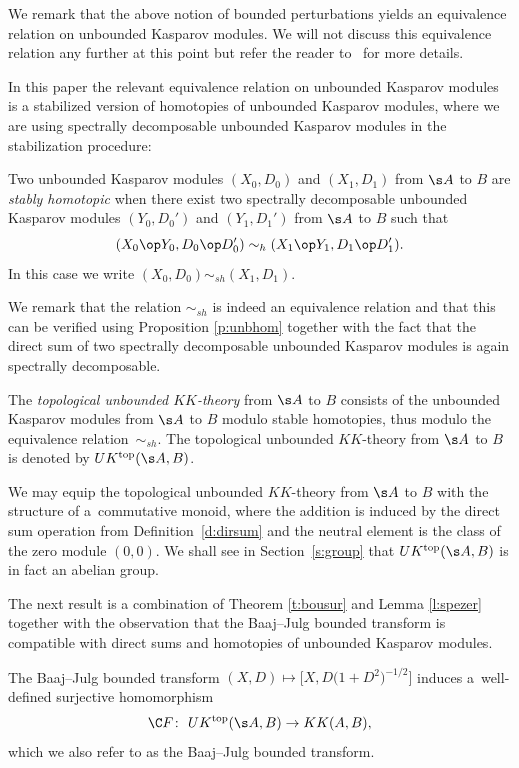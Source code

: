 We remark that the above notion of bounded perturbations yields an equivalence relation on unbounded Kasparov modules. We will not discuss this equivalence relation any further at this point but refer the reader to~\cite{Kaa:MEU} for more details.

In this paper the relevant equivalence relation on unbounded Kasparov modules is a stabilized version of homotopies of unbounded Kasparov modules, where we are using spectrally decomposable unbounded Kasparov modules in the stabilization procedure:

\begin{dfn}
Two unbounded Kasparov modules $(X_0,D_0)$ and $(X_1,D_1)$ from $\s A$ to $B$ are \emph{stably homotopic} when there exist two spectrally decomposable unbounded Kasparov modules $(Y_0,D_0')$ and $(Y_1,D_1')$ from $\s A$ to $B$ such that
\[
(X_0 \op Y_0,D_0 \op D_0') \sim_h (X_1 \op Y_1, D_1 \op D_1') .
\]
In this case we write $(X_0,D_0) \sim_{sh} (X_1,D_1)$.
\end{dfn}

We remark that the relation $\sim_{sh}$ is indeed an equivalence relation and that this can be verified using Proposition \ref{p:unbhom} together with the fact that the direct sum of two spectrally decomposable unbounded Kasparov modules is again spectrally decomposable.

\begin{dfn}
The \emph{topological unbounded $KK$-theory} from $\s A$ to $B$ consists of the unbounded Kasparov modules from $\s A$ to $B$ modulo stable homotopies, thus modulo the equivalence relation~$\sim_{sh}$. The topological unbounded $KK$-theory from $\s A$ to $B$ is denoted by $UK^{{\rm top}}(\s A, B)$.
\end{dfn}

We may equip the topological unbounded $KK$-theory from $\s A$ to $B$ with the structure of a~commutative monoid, where the addition is induced by the direct sum operation from Definition~\ref{d:dirsum} and the neutral element is the class of the zero module $(0,0)$. We shall see in Section~\ref{s:group} that $UK^{{\rm top}}(\s A,B)$ is in fact an abelian group.

The next result is a combination of Theorem \ref{t:bousur} and Lemma \ref{l:spezer} together with the observation that the Baaj--Julg bounded transform is compatible with direct sums and homotopies of unbounded Kasparov modules.

\begin{Theorem}\label{t:baajul}
The Baaj--Julg bounded transform $(X,D) \mapsto \big[ X, D\big(1 + D^2\big)^{-1/2}\big]$ induces a~well-defined surjective homomorphism
\[
\C F\colon \ UK^{{\rm top}}(\s A, B) \to KK(A,B) ,
\]
which we also refer to as the Baaj--Julg bounded transform.
\end{Theorem}

